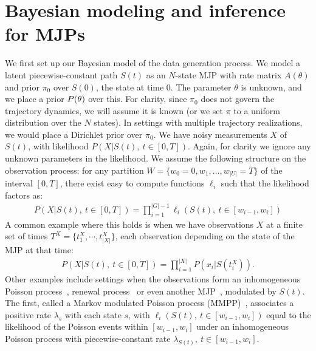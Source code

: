 \section{Bayesian modeling and inference for MJPs}
We first set up our Bayesian model of the data generation process. 
We model a latent piecewise-constant path $S(t)$ as an $N$-state MJP with rate matrix $A(\theta)$ and prior $\pi_0$ over $S(0)$, the state at time $0$. 
The parameter $\theta$ is unknown, and we place a prior $P(\theta)$ over this. 
For clarity, since $\pi_0$ does not govern the trajectory dynamics, we will assume it is known (or we set $\pi$ to a uniform distribution over the $N$ states). 
In settings with multiple trajectory realizations, we would place a Dirichlet prior over $\pi_0$. 
We have noisy measurements $X$ of $S(t)$, with likelihood $P(X|S(t),\ t \in [0,T])$.
Again, for clarity we ignore any unknown parameters in the likelihood.
We assume the following structure on the observation process: for any partition $W = \{w_0 = 0, w_1, \dotsc, w_{|U|}=T\}$ of the interval $[0,T]$, there exist easy to compute functions $\ell_i$ such that the likelihood factors as:
\begin{align}
  \label{eq:lik_factor}
  P(X|S(t),\ t \in [0,T]) = \prod_{i=1}^{|G|-1} \ell_i(S(t),\ t \in [w_{i-1},w_i])
\end{align}
A common example where this holds is when we have observations $X$ at a finite set of times $T^X = \{t^X_1,\cdots, t^X_{|X|}\}$, each observation depending on the state of the MJP at that time:
\begin{align}
  \label{eq:lik_factor}
  P(X|S(t),\ t \in [0,T]) = \prod_{i=1}^{|X|} P(x_i|S(t^X_i)).
\end{align}
Other examples include settings when the observations form an inhomogeneous Poisson process~\citep{FearnSher2006}, renewal process~\citep{rao2011gaussian} or even another MJP~\citep{Nodelman+al:UAI02,RaoTeh13}, modulated by $S(t)$.
The first, called a Markov modulated Poisson process (MMPP)~\citep{scottmmpp03}, associates a positive rate $\lambda_s$ with each state $s$, with $\ell_i(S(t),\ t \in [w_{i-1},w_i])$ equal to the likelihood of the Poisson events within $[w_{i-1},w_i]$ under an inhomogeneous Poisson process with piecewise-constant rate $\lambda_{S(t)},\ t \in [w_{i-1},w_i]$.


